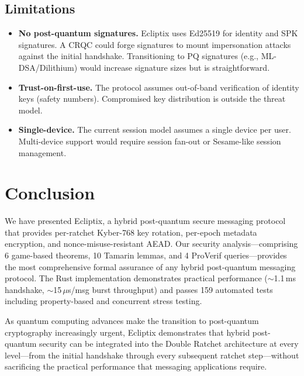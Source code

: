 \documentclass[11pt,a4paper]{article}
\theoremstyle{definition}
\begin{document}
\subsection{Limitations}

\begin{itemize}
  \item \textbf{No post-quantum signatures.} Ecliptix uses Ed25519 for identity and SPK signatures. A CRQC could forge signatures to mount impersonation attacks against the initial handshake. Transitioning to PQ signatures (e.g., ML-DSA/Dilithium) would increase signature sizes but is straightforward.
  \item \textbf{Trust-on-first-use.} The protocol assumes out-of-band verification of identity keys (safety numbers). Compromised key distribution is outside the threat model.
  \item \textbf{Single-device.} The current session model assumes a single device per user. Multi-device support would require session fan-out or Sesame-like session management.
\end{itemize}


\section{Conclusion}\label{sec:conclusion}

We have presented Ecliptix, a hybrid post-quantum secure messaging protocol that provides per-ratchet Kyber-768 key rotation, per-epoch metadata encryption, and nonce-misuse-resistant AEAD. Our security analysis---comprising 6 game-based theorems, 10 Tamarin lemmas, and 4 ProVerif queries---provides the most comprehensive formal assurance of any hybrid post-quantum messaging protocol. The Rust implementation demonstrates practical performance ($\sim$1.1\,ms handshake, $\sim$15\,$\mu$s/msg burst throughput) and passes 159 automated tests including property-based and concurrent stress testing.

As quantum computing advances make the transition to post-quantum cryptography increasingly urgent, Ecliptix demonstrates that hybrid post-quantum security can be integrated into the Double Ratchet architecture at every level---from the initial handshake through every subsequent ratchet step---without sacrificing the practical performance that messaging applications require.
\end{document}
